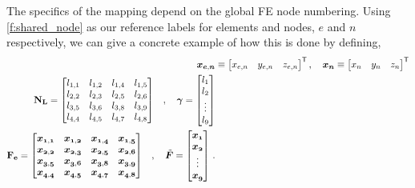 \documentclass[11pt]{iopart}
\begin{document}
%
The specifics of the mapping depend on the global FE node numbering. Using \cref{f:shared_node} as our reference labels for elements and nodes, $e$ and $n$ respectively, we can give a concrete example of how this is done by defining,
\begin{subequations}
    \begin{align}
        \vec{x_{e,n}} & \equiv	\begin{bmatrix}
            x_{e,n} & y_{e,n} & z_{e,n}
        \end{bmatrix}^{\mathsf{T}}, \quad
        \vec{x_{n}} \equiv	\begin{bmatrix}
            x_{n} & y_{n} & z_{n}
        \end{bmatrix}^{\mathsf{T}}            \\
        \begin{split}
            \mtx{N_{L}} &=	\begin{bmatrix}
                l_{1,1} & l_{1,2} & l_{1,4} & l_{1,5} \\
                l_{2,2} & l_{2,3} & l_{2,5} & l_{2,6} \\
                l_{3,5} & l_{3,6} & l_{3,8} & l_{3,9} \\
                l_{4,4} & l_{4,5} & l_{4,7} & l_{4,8} \\
            \end{bmatrix}
        \end{split}
        , \quad
        \vec{\gamma} =   \begin{bmatrix}
            l_1    \\
            l_2    \\
            \vdots \\
            l_9
        \end{bmatrix}                          \\
        \begin{split}
            \mtx{F_{e}} &=	\begin{bmatrix}
                \vec{x_{1,1}} & \vec{x_{1,2}} & \vec{x_{1,4}} & \vec{x_{1,5}} \\
                \vec{x_{2,2}} & \vec{x_{2,3}} & \vec{x_{2,5}} & \vec{x_{2,6}} \\
                \vec{x_{3,5}} & \vec{x_{3,6}} & \vec{x_{3,8}} & \vec{x_{3,9}} \\
                \vec{x_{4,4}} & \vec{x_{4,5}} & \vec{x_{4,7}} & \vec{x_{4,8}} \\
            \end{bmatrix}
        \end{split}
        ,\quad
        \vec{\tilde{F}} = 	\begin{bmatrix}
            \vec{x_{1}} \\
            \vec{x_{2}} \\
            \vdots      \\
            \vec{x_{9}}
        \end{bmatrix}\,.\label{eq:force_imp}
    \end{align}
\end{subequations}
\end{document}
